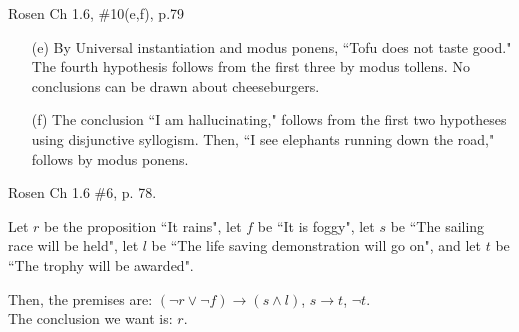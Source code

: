 \documentclass[12pt,addpoints]{exam}
\begin{document}
\begin{questions}
\begin{solution}
\begin{itemize}[itemsep=0pt,parsep=0pt,topsep=0pt,partopsep=0pt]
        \end{itemize}
\end{solution}


\question Rosen Ch 1.6, \#10(e,f), p.79 
    \ifprintanswers
        \vspace{-10pt}
    \fi
\begin{solution}
    \begin{itemize}[itemsep=0pt,parsep=0pt,topsep=0pt,partopsep=0pt]
        \item[(e)]  By Universal instantiation and modus ponens, ``Tofu does not taste good." The fourth hypothesis follows from the first three by modus tollens.  No conclusions can be drawn about cheeseburgers.
        \item[(f)] The conclusion ``I am hallucinating," follows from the first two hypotheses using disjunctive syllogism.  Then, ``I see elephants running down the road," follows by modus ponens.
    \end{itemize}
\end{solution}
    

\question Rosen Ch 1.6 \#6, p. 78.
    \ifprintanswers
        \vspace{-10pt}
    \fi
\begin{solution}
Let $r$ be the proposition ``It rains", let $f$ be ``It is foggy",
    let $s$ be ``The sailing race will be held", let $l$ be ``The life
    saving demonstration will go on", and let $t$ be ``The trophy will
    be awarded".

    Then, the premises are: $(\neg r \vee \neg f) \rightarrow (s \wedge l)$, $s \rightarrow t$, $\neg t$. \\
    The conclusion we want is: $r$.


\end{solution}
\end{questions}
\end{document}

